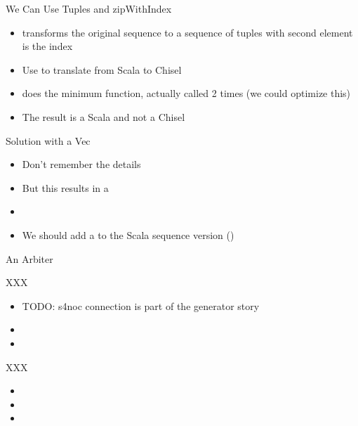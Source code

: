 \begin{frame}[fragile]{We Can Use Tuples and zipWithIndex}
\begin{itemize}
\item {} transforms the original sequence to a sequence of tuples
with second element is the index
\item Use  to translate from Scala  to Chisel 
\item {} does the minimum function, actually called 2 times (we could optimize this)
\item The result is a Scala  and not a Chisel 
\end{itemize}
\end{frame}

\begin{frame}[fragile]{Solution with a Vec}
\begin{itemize}
\item Don't remember the details
\item But this results in a 
\item
\item We should add a  to the Scala sequence version ()
\end{itemize}
\end{frame}

\begin{frame}[fragile]{An Arbiter}
\end{frame}



\begin{frame}[fragile]{XXX}
\begin{itemize}
\item TODO: s4noc connection is part of the generator story
\item
\item
\end{itemize}
\end{frame}

\begin{frame}[fragile]{XXX}
\begin{itemize}
\item
\item
\item
\end{itemize}
\end{frame}

